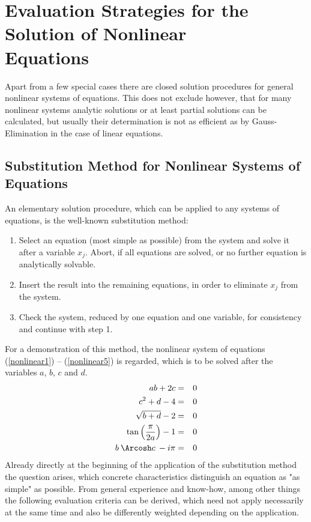 \section[Evaluation Strategies for the Solution of Nonlinear Equations]%
{Evaluation Strategies for the Solution of Nonlinear \\Equations}

Apart from a few special cases there are closed solution procedures for general nonlinear systems of equations. 
This does not exclude however, that for many nonlinear systems analytic solutions or at least partial solutions can be calculated, but usually their determination is not as efficient as by Gauss-Elimination in the case of linear equations.

\subsection{\label{Einsetzverfahren}Substitution Method for Nonlinear Systems of Equations}

An elementary solution procedure, which can be applied to any systems of equations, is the well-known substitution method:
\begin{enumerate}
\item 
Select an equation (most simple as possible)  from the system and solve it after a variable $x_j$. Abort, if all equations are solved, or no further equation is analytically solvable.
\item Insert the result into the remaining equations, in order to eliminate $x_j$ from the system.
\item Check the system, reduced by one equation and one variable, for consistency and continue with step 1.
\end{enumerate}
For a demonstration of this method, the nonlinear system of equations  (\ref{nonlinear1}) -- (\ref{nonlinear5}) is regarded, which is to be solved after the variables $a$, $b$, $c$ and $d$.
\begin{eqnarray}
                                ab + 2c &=& 0  \label{nonlinear1} \\
                           c^2 + d -  4 &=& 0  \label{nonlinear2} \\
                      \sqrt{b + d} -  2 &=& 0  \\
\tan \left( \frac{\pi}{2a} \right) -  1 &=& 0  \label{nonlinear4} \\
              b \: \Arcosh c \: - i \pi &=& 0  \label{nonlinear5}
\end{eqnarray}
Already directly at the beginning of the application of the substitution method the question arises, which concrete characteristics distinguish an equation as  "as simple"  as possible. From general experience and know-how, among other things the following evaluation criteria can be derived, which need not apply necessarily at the same time and also be differently weighted depending on the application.

